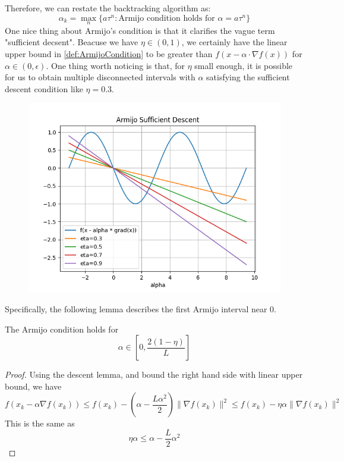 Therefore, we can restate the backtracking algorithm as:
\begin{equation*}
    \alpha_k = \max_n \{ a\tau^n : \text{Armijo condition holds for }\alpha = a\tau^n \}
\end{equation*}
One nice thing about Armijo's condition is that it clarifies the vague term "sufficient decsent". Beacuse we have $\eta \in (0,1)$, we certainly have the linear upper bound in \ref{def:ArmijoCondition} to be greater than $f(x - \alpha \cdot \nabla f(x))$ for $\alpha \in (0, \epsilon)$. One thing worth noticing is that, for $\eta$ small enough, it is possible for us to obtain multiple disconnected intervals with $\alpha$ satisfying the sufficient descent condition like $\eta = 0.3$.

\begin{figure}[H]
    \centering
    \includegraphics[scale=0.6]{plot_maker/Armijo_Sufficient_Descent/Armijo_sufficient_descent.png}
\end{figure}

Specifically, the following lemma describes the first Armijo interval near 0.

\begin{lemma}\label{lemma:ArmijoStepSizeBound}
    The Armijo condition holds for 
    \begin{equation*}
        \alpha \in [0, \frac{2(1 - \eta)}{L}]
    \end{equation*}
\end{lemma}
\begin{proof}
    Using the descent lemma, and bound the right hand side with linear upper bound, we have
    \begin{equation*}
        f(x_k - \alpha \nabla f(x_k)) \leq f(x_k) - (\alpha - \frac{L\alpha^2}{2})\|\nabla f(x_k)\|^2 \leq f(x_k) - \eta\alpha\|\nabla f(x_k) \|^2
    \end{equation*}
    This is the same as
    \begin{equation*}
        \eta\alpha \leq \alpha - \frac{L}{2}\alpha^2
    \end{equation*}
\end{proof}

